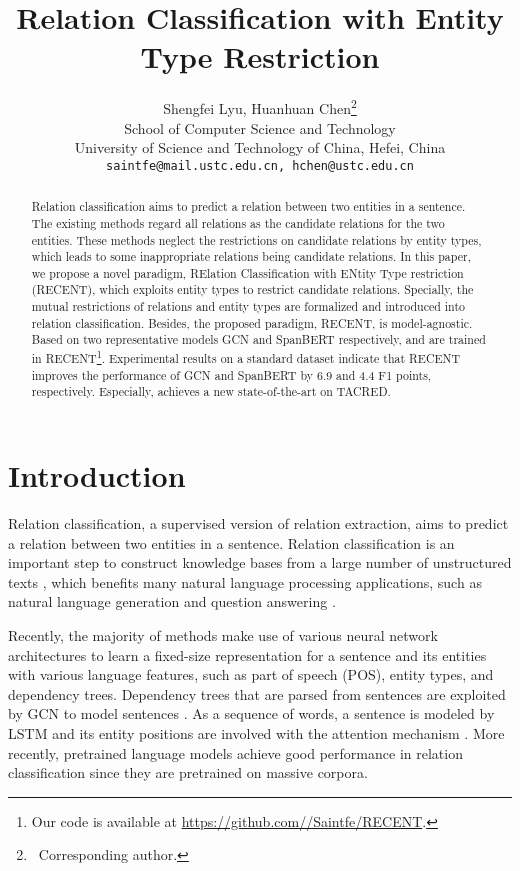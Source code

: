 \documentclass[11pt,a4paper]{article}
\title{Relation Classification with Entity Type Restriction}
\author{Shengfei Lyu, \quad Huanhuan Chen\thanks{\, Corresponding author.} \\
  School of Computer Science and Technology \\
  University of Science and Technology of China, Hefei, China  \\
  \texttt{saintfe@mail.ustc.edu.cn, hchen@ustc.edu.cn} }
\date{}
\begin{document}
\maketitle

\begin{abstract}
Relation classification aims to predict a relation between two entities in a sentence. 
The existing methods regard all relations as the candidate relations for the two entities. 
These methods  neglect the restrictions on candidate relations by entity types, 
which leads to some inappropriate relations 
being candidate relations. 
In this paper, we propose a novel paradigm,  RElation Classification with ENtity Type restriction (RECENT), 
which exploits entity types to restrict candidate relations. 
Specially, the mutual restrictions of relations and entity types are formalized and 
introduced into relation classification. Besides, the proposed paradigm, RECENT, 
is model-agnostic. 
Based on two representative models GCN and SpanBERT respectively, 
 and  
 are trained in RECENT\footnote{Our code is available at \url{https://github.com//Saintfe/RECENT}.}.
Experimental results on a standard dataset indicate that 
RECENT improves the performance of GCN and SpanBERT by 6.9 and 4.4 F1 points, respectively. 
Especially,  achieves a new state-of-the-art on TACRED.

\end{abstract}


\section{Introduction}


Relation classification, a supervised version of relation extraction, aims to predict a relation between two entities in a sentence. 
Relation classification is an important step to construct knowledge bases from a large number of unstructured texts \cite{trisedya-etal-2019-neural}, 
which benefits many natural language processing applications, 
such as natural language generation \cite{kang-hashimoto-2020-improved} and question answering \cite{zhao-2020-conditiion}.

Recently, the majority of methods make use of various neural network architectures to learn a fixed-size representation for a sentence and its entities  
with various language features, such as part of speech (POS), entity types, and dependency trees. 
Dependency trees that are parsed from sentences are exploited by GCN \cite{kipf-2017-gcn} to  model sentences \cite{zhang-etal-2018-graph, guo-etal-2019-attention}. 
As a sequence of words, a sentence is modeled by LSTM \cite{hochreiter1997long} and its entity positions are involved with the attention mechanism \cite{zhang-etal-2017-position}.
More recently, pretrained language models \cite{devlin-etal-2019-bert,baldini-soares-etal-2019-matching,joshi-etal-2020-spanbert} 
achieve good performance in relation classification since they are pretrained on massive corpora.
\end{document}
